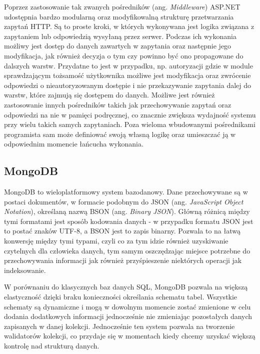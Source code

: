 Poprzez zastosowanie tak zwanych pośredników (ang. \textit{Middleware}) ASP.NET udostępnia
bardzo modularną oraz modyfikowalną strukturę przetwarzania zapytań HTTP.
Są to proste kroki, w których wykonywana jest logika związana z zapytaniem lub odpowiedzią
wysyłaną przez serwer. Podczas ich wykonania możliwy jest dostęp do danych zawartych
w zapytania oraz następnie jego modyfikacja, jak również decyzja o tym czy powinno
być ono propagowane do dalszych warstw. Przydatne to jest w przypadku, np. autoryzacji
gdzie w module sprawdzającym tożsamość użytkownika możliwe jest modyfikacja oraz zwrócenie
odpowiedzi o nieautoryzowanym dostępie i nie przekazywanie zapytania dalej do warstw, które zajmują
się dostępem do danych. Możliwe jest również zastosowanie innych pośredników takich
jak przechowywanie zapytań oraz odpowiedzi na nie w pamięci podręcznej, co znacznie
zwiększa wydajność systemu przy wielu takich samych zapytaniach. Poza wieloma wbudowanymi
pośrednikami programista sam może definiować swoją własną logikę oraz umieszczać
ją w odpowiednim momencie łańcucha wykonania.

\subsection*{MongoDB}
MongoDB to wieloplatformowy system bazodanowy. Dane przechowywane są w postaci dokumentów,
w formacie podobnym do JSON (ang. \textit{JavaScript Object Notation}), określaną nazwą
BSON (ang. \textit{Binary JSON}). Główną różnicą między tymi formatami jest sposób kodowania
danych - w przypadku formatu JSON jest to postać znaków UTF-8, a BSON jest to zapis binarny.
Pozwala to na łatwą konwersję między tymi typami, czyli co za tym idzie również uzyskiwanie
czytelnych dla człowieka danych, tym samym oszczędzając miejsce potrzebne do przechowywania
informacji jak również przyśpieszenie niektórych operacji jak indeksowanie.

W porównaniu do klasycznych baz danych SQL, MongoDB pozwala na większą elastyczność dzięki braku
konieczności określania schematu tabel. Wszystkie schematy są dynamiczne i mogą w dowolnym momencie 
zostać zmienione w celu dodania dodatkowych informacji jednocześnie nie zmieniając pozostałych
danych zapisanych w danej kolekcji. Jednocześnie ten system pozwala na tworzenie 
walidatorów kolekcji, co przydaje się w momentach kiedy chcemy uzyskać większą kontrolę
nad strukturą danych.

